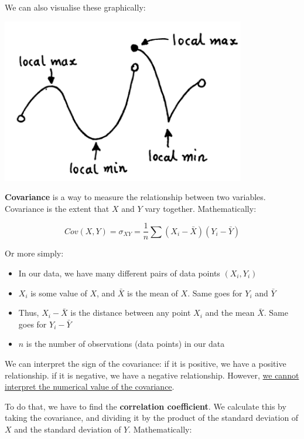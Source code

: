 \documentclass[
  a4paper,
]{report}
\begin{document}
We can also visualise these graphically:

\begin{center}
\includegraphics[width=0.8\textwidth,height=\textheight]{figures/1/3.1.png}
\end{center}

\textbf{Covariance} is a way to measure the relationship between two
variables. Covariance is the extent that \(X\) and \(Y\) vary together.
Mathematically:

\[
Cov(X,Y) = \sigma_{XY} = \frac{1}{n} \sum (X_i - \bar{X})(Y_i - \bar{Y})
\]

Or more simply:

\begin{itemize}
\item
  In our data, we have many different pairs of data points
  \((X_i, Y_i)\)
\item
  \(X_i\) is some value of \(X\), and \(\bar{X}\) is the mean of \(X\).
  Same goes for \(Y_i\) and \(\bar{Y}\)
\item
  Thus, \(X_i - \bar{X}\) is the distance between any point \(X_i\) and
  the mean \(\bar{X}\). Same goes for \(Y_i - \bar{Y}\)
\item
  \(n\) is the number of observations (data points) in our data
\end{itemize}

We can interpret the sign of the covariance: if it is positive, we have
a positive relationship. if it is negative, we have a negative
relationship. However, \ul{we cannot interpret the numerical value of
the covariance}.

To do that, we have to find the \textbf{correlation coefficient}. We
calculate this by taking the covariance, and dividing it by the product
of the standard deviation of \(X\) and the standard deviation of \(Y\).
Mathematically:
\end{document}
